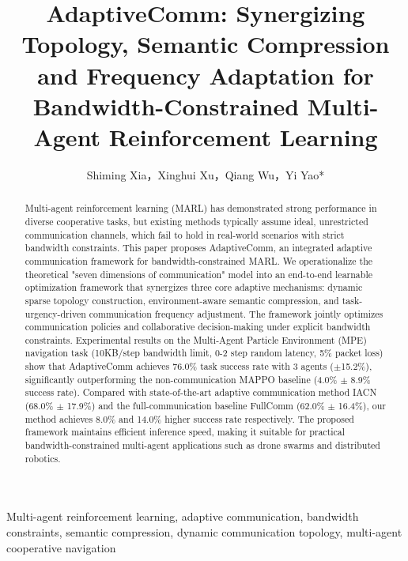 \documentclass[10pt, twocolumn]{IEEEtran}
\begin{document}
\title{AdaptiveComm: Synergizing Topology, Semantic Compression and Frequency Adaptation for Bandwidth-Constrained Multi-Agent Reinforcement Learning}

\author{Shiming Xia，Xinghui Xu，Qiang Wu，Yi Yao*}

\maketitle

\begin{abstract}
Multi-agent reinforcement learning (MARL) has demonstrated strong performance in diverse cooperative tasks, but existing methods typically assume ideal, unrestricted communication channels, which fail to hold in real-world scenarios with strict bandwidth constraints. This paper proposes AdaptiveComm, an integrated adaptive communication framework for bandwidth-constrained MARL. We operationalize the theoretical "seven dimensions of communication" model into an end-to-end learnable optimization framework that synergizes three core adaptive mechanisms: dynamic sparse topology construction, environment-aware semantic compression, and task-urgency-driven communication frequency adjustment. The framework jointly optimizes communication policies and collaborative decision-making under explicit bandwidth constraints. Experimental results on the Multi-Agent Particle Environment (MPE) navigation task (10KB/step bandwidth limit, 0-2 step random latency, 5\% packet loss) show that AdaptiveComm achieves 76.0\% task success rate with 3 agents ($\pm$15.2\%), significantly outperforming the non-communication MAPPO baseline (4.0\% $\pm$ 8.9\% success rate). Compared with state-of-the-art adaptive communication method IACN (68.0\% $\pm$ 17.9\%) and the full-communication baseline FullComm (62.0\% $\pm$ 16.4\%), our method achieves 8.0\% and 14.0\% higher success rate respectively. The proposed framework maintains efficient inference speed, making it suitable for practical bandwidth-constrained multi-agent applications such as drone swarms and distributed robotics.
\end{abstract}

\begin{IEEEkeywords}
Multi-agent reinforcement learning, adaptive communication, bandwidth constraints, semantic compression, dynamic communication topology, multi-agent cooperative navigation
\end{IEEEkeywords}
\end{document}
